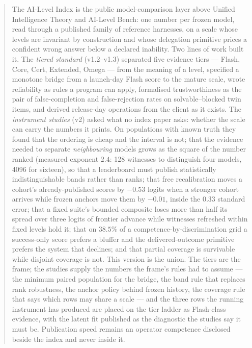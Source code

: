 \begin{abstract}
\noindent The AI-Level Index is the public model-comparison layer above Unified Intelligence Theory and AI-Level Bench: one number per frozen model, read through a published family of reference harnesses, on a scale whose levels are invariant by construction and whose delegation primitive prices a confident wrong answer below a declared inability. Two lines of work built it. The \emph{tiered standard} (v1.2--v1.3) separated five evidence tiers --- Flash, Core, Cert, Extended, Omega --- from the meaning of a level, specified a monotone bridge from a launch-day Flash score to the mature scale, wrote reliability as rules a program can apply, formalised trustworthiness as the pair of false-completion and false-rejection rates on solvable--blocked twin items, and derived release-day operations from the client as it exists. The \emph{instrument studies} (v2) asked what no index paper asks: whether the scale can carry the numbers it prints. On populations with known truth they found that the ordering is cheap and the interval is not; that the evidence needed to separate \emph{neighbouring} models grows as the square of the number ranked (measured exponent $2.4$: 128 witnesses to distinguish four models, 4096 for sixteen), so that a leaderboard must publish statistically indistinguishable bands rather than ranks; that free recalibration moves a cohort's already-published scores by $-0.53$ logits when a stronger cohort arrives while frozen anchors move them by $-0.01$, inside the $0.33$ standard error; that a fixed suite's bounded composite loses more than half its spread over three logits of frontier advance while witnesses refreshed within fixed levels hold it; that on $38.5\%$ of a competence-by-discrimination grid a success-only score prefers a bluffer and the delivered-outcome primitive prefers the system that declines; and that partial coverage is survivable while disjoint coverage is not. This version is the union. The tiers are the frame; the studies supply the numbers the frame's rules had to assume --- the minimum paired population for the bridge, the band rule that replaces rank robustness, the anchor policy behind frozen history, the coverage rule that says which rows may share a scale --- and the three rows the running instrument has produced are placed on the tier ladder as Flash-class evidence, with the latent fit published as the diagnostic the studies say it must be. Publication speed remains an operator competence disclosed beside the index and never inside it.
\end{abstract}

